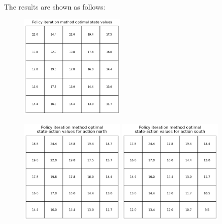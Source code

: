 \begin{homeworkProblem}
The results are shown as follows:
\begin{figure}[h]
    \centering
    \vspace{-0.2cm}
    \includegraphics[width=0.45\textwidth]{./figure/p3_output/optimal/policy_iteration/V_value.png}
    \vspace{-0.5cm}
\end{figure}
\begin{figure}[h]
    \centering
    \vspace{-0.3cm}
    \includegraphics[width=0.45\textwidth]{./figure/p3_output/optimal/policy_iteration/Q_north.png}
    \includegraphics[width=0.45\textwidth]{./figure/p3_output/optimal/policy_iteration/Q_south.png}
    \vspace{-0.5cm}
\end{figure}
\begin{figure}[!htbp]

\end{figure}
\end{homeworkProblem}
